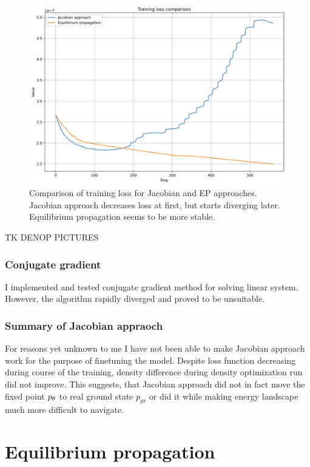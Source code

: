 \documentclass[a4paper,10.5pt]{report}
\begin{document}
\begin{figure}[h!]
 \centering
 \includegraphics[scale=0.5]{images/loss_comparison.png}
 \caption{Comparison of training loss for Jacobian and EP approaches. Jacobian approach decreases loss at first, but starts diverging later. Equilibrium propagation seems to be more stable.}
 \label{fig:jac-eqprop-loss}
\end{figure}



TK DENOP PICTURES

\subsubsection{Conjugate gradient}
I implemented and tested conjugate gradient method for solving linear system. However, the algorithm rapidly diverged and proved to be unsuitable.
\subsubsection{Summary of Jacobian appraoch}

 For reasons yet unknown to me I have not been able to make Jacobian approach work for the purpose of finetuning the model. Despite loss function decreasing during course of the training, density difference during density optimization run did not improve. This suggests, that Jacobian approach did not in fact move the fixed point $p_\theta$ to real ground state $p_{gs}$ or did it while making energy landscape much more difficult to navigate.


\section{ Equilibrium propagation}
\end{document}
